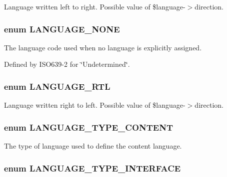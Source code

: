 \label{bootstrap_8inc_a8790965df4de009fe8bdcf17f6a5c738}
Language written left to right. Possible value of \$language-\/$>$direction. \hypertarget{bootstrap_8inc_a9e91e2136aa0ce5c5e80f06aa3ad8266}{
\subsubsection[{LANGUAGE\_\-NONE}]{\setlength{\rightskip}{0pt plus 5cm}enum {\bf LANGUAGE\_\-NONE}}}
\label{bootstrap_8inc_a9e91e2136aa0ce5c5e80f06aa3ad8266}
The language code used when no language is explicitly assigned.

Defined by ISO639-\/2 for \char`\"{}Undetermined\char`\"{}. \hypertarget{bootstrap_8inc_ac3c2ed4c787f238d2d39d644dbdcb6d4}{
\subsubsection[{LANGUAGE\_\-RTL}]{\setlength{\rightskip}{0pt plus 5cm}enum {\bf LANGUAGE\_\-RTL}}}
\label{bootstrap_8inc_ac3c2ed4c787f238d2d39d644dbdcb6d4}
Language written right to left. Possible value of \$language-\/$>$direction. \hypertarget{bootstrap_8inc_a40466aefcfc6ea9766f1fedf53cb3a6d}{
\subsubsection[{LANGUAGE\_\-TYPE\_\-CONTENT}]{\setlength{\rightskip}{0pt plus 5cm}enum {\bf LANGUAGE\_\-TYPE\_\-CONTENT}}}
\label{bootstrap_8inc_a40466aefcfc6ea9766f1fedf53cb3a6d}
The type of language used to define the content language. \hypertarget{bootstrap_8inc_adcc8b40b0d1ee5cd37f1c7314cc541dc}{
\subsubsection[{LANGUAGE\_\-TYPE\_\-INTERFACE}]{\setlength{\rightskip}{0pt plus 5cm}enum {\bf LANGUAGE\_\-TYPE\_\-INTERFACE}}}
